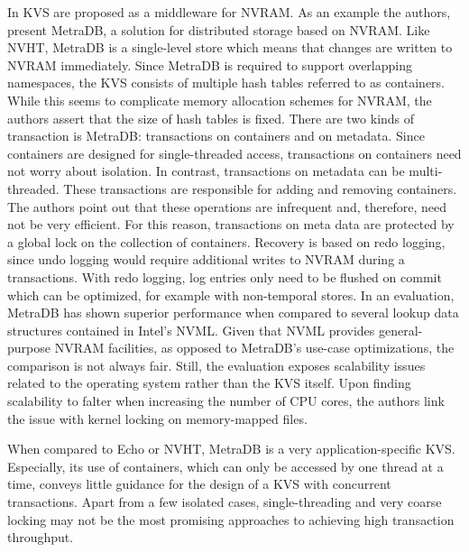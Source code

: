 In \cite{marmol2016nonvolatile} \ac{KVS} are proposed as a middleware for \ac{NVRAM}. As
an example the authors, present MetraDB, a solution for distributed storage
based on \ac{NVRAM}. Like NVHT, MetraDB is a single-level store which means that
changes are written to \ac{NVRAM} immediately. Since MetraDB is required to support
overlapping namespaces, the \ac{KVS} consists of multiple hash tables referred to as
containers. While this seems to complicate memory allocation schemes for \ac{NVRAM},
the authors assert that the size of hash tables is fixed. There are two kinds of
transaction is MetraDB: transactions on containers and on metadata. Since
containers are designed for single-threaded access, transactions on containers
need not worry about isolation. In contrast, transactions on metadata can be
multi-threaded. These transactions are responsible for adding and removing
containers. The authors point out that these operations are infrequent and,
therefore, need not be very efficient. For this reason, transactions on meta
data are protected by a global lock on the collection of containers. Recovery is
based on redo logging, since undo logging would require additional writes to
\ac{NVRAM} during a transactions. With redo logging, log entries only need to be
flushed on commit which can be optimized, for example with non-temporal stores.
In an evaluation, MetraDB has shown superior performance when compared to
several lookup data structures contained in Intel's NVML. Given that NVML
provides general-purpose \ac{NVRAM} facilities, as opposed to MetraDB's use-case
optimizations, the comparison is not always fair. Still, the evaluation exposes
scalability issues related to the operating system rather than the \ac{KVS} itself.
Upon finding scalability to falter when increasing the number of \ac{CPU} cores, the
authors link the issue with kernel locking on memory-mapped files.

When compared to Echo or NVHT, MetraDB is a very application-specific \ac{KVS}.
Especially, its use of containers, which can only be accessed by one thread at a
time, conveys little guidance for the design of a \ac{KVS} with concurrent
transactions. Apart from a few isolated cases, single-threading and very coarse
locking may not be the most promising approaches to achieving high transaction
throughput.
